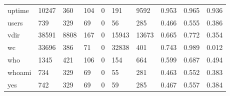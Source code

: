\begin{longtable}{lp{1.3cm}p{1.3cm}p{1.3cm}p{1.3cm}p{1.3cm}p{1.3cm}p{1.3cm}p{1.3cm}p{1.3cm}}
uptime    &                  10247 &                                360 &                               104 &                                0 &                               191 &                            9592 &                                0.953 &                                  0.965 &                                0.936 \\
users     &                    739 &                                329 &                                69 &                                0 &                                56 &                             285 &                                0.466 &                                  0.555 &                                0.386 \\
vdir      &                  38591 &                               8808 &                               167 &                                0 &                             15943 &                           13673 &                                0.665 &                                  0.772 &                                0.354 \\
wc        &                  33696 &                                386 &                                71 &                                0 &                             32838 &                             401 &                                0.743 &                                  0.989 &                                0.012 \\
who       &                   1345 &                                421 &                               106 &                                0 &                               154 &                             664 &                                0.599 &                                  0.687 &                                0.494 \\
whoami    &                    734 &                                329 &                                69 &                                0 &                                55 &                             281 &                                0.463 &                                  0.552 &                                0.383 \\
yes       &                    742 &                                329 &                                69 &                                0 &                                59 &                             285 &                                0.467 &                                  0.557 &                                0.384 \\
\end{longtable}
